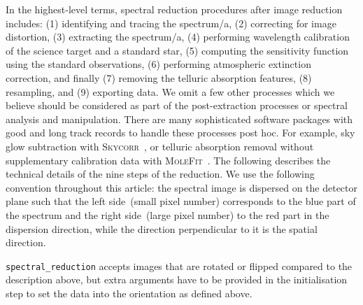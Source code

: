 \documentclass[linenumbers, twocolumn]{aastex631}
\begin{document}
In the highest-level terms, spectral reduction procedures after image reduction
includes: (1) identifying and tracing the spectrum/a, (2) correcting for image
distortion, (3) extracting the spectrum/a, (4) performing wavelength
calibration of the science target and a standard star, (5) computing the
sensitivity function using the standard observations, (6) performing atmospheric
extinction correction, and finally (7) removing the telluric absorption
features, (8) resampling, and (9) exporting data. We omit a few other
processes which we believe should be considered as part of the post-extraction
processes or spectral analysis and manipulation. There are many sophisticated 
software packages with good and long track records to handle these processes
post hoc. For example, sky glow subtraction with
\textsc{Skycorr}~\citep{2014A&A...567A..25N}, or telluric
absorption removal without supplementary calibration data with
\textsc{MoleFit}~\citep{2015A&A...576A..77S, 2015A&A...576A..78K}.
The following describes the technical details of the nine steps of the reduction.
We use the following convention throughout this article: the spectral image is
dispersed on the detector plane such that the left side~(small pixel number)
corresponds to the blue part of the spectrum and the right side~(large pixel
number) to the red part in the dispersion direction, while the direction
perpendicular to it is the spatial direction.

\texttt{spectral\_reduction} accepts images that are rotated or flipped
compared to the description above, but extra arguments have to be provided
in the initialisation step to set the data into the orientation as defined
above.

\end{document}

